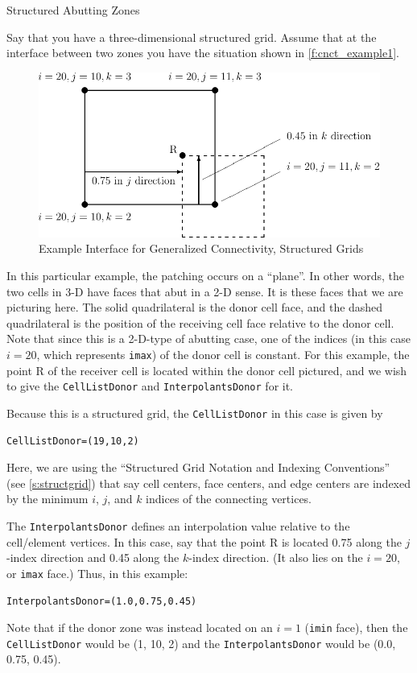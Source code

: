 \begin{example}{Structured Abutting Zones}
\label{ex:struct_abut}

Say that you have a three-dimensional structured grid.
Assume that at the interface between two zones you have the 
situation shown in \autoref{f:cnct_example1}.

\begin{figure}[!htb]
   \centering
   \includegraphics{cnct.figs/cnct_example1}
   \caption{Example Interface for Generalized Connectivity, Structured Grids}
   \label{f:cnct_example1}
\end{figure}

In this particular example, the patching occurs on a ``plane''.
In other words, the two cells in 3-D have faces that abut in a 2-D
sense.
It is these faces that we are picturing here.
The solid quadrilateral is the donor cell face, and the dashed
quadrilateral is the position of the receiving cell face relative to the
donor cell.
Note that since this is a 2-D-type of abutting case, one of the indices
(in this case $i = 20$, which represents \texttt{imax}) of the
donor cell is constant.
For this example, the point R of the receiver cell is located within the
donor cell pictured, and we wish to give the \texttt{CellListDonor} and
\texttt{InterpolantsDonor} for it.

Because this is a structured grid, the \texttt{CellListDonor} in this
case is given by
\begin{alltt}
   CellListDonor = (19, 10, 2)
\end{alltt}

Here, we are using the ``Structured Grid Notation and Indexing
Conventions'' (see \autoref{s:structgrid}) that say cell centers, face
centers, and edge centers are indexed by the minimum $i$, $j$, and $k$
indices of the connecting vertices.

The \texttt{InterpolantsDonor} defines an interpolation value relative
to the cell/element vertices.
In this case, say that the point R is located 0.75 along the
$j$-index direction and 0.45 along the $k$-index direction.
(It also lies on the $i = 20$, or \texttt{imax} face.)
Thus, in this example:
\begin{alltt}
   InterpolantsDonor = (1.0, 0.75, 0.45) 
\end{alltt}
Note that if the donor zone was instead located on an $i = 1$
(\texttt{imin} face), then the \texttt{CellListDonor} would be (1, 10, 2)
and the \texttt{InterpolantsDonor} would be (0.0, 0.75, 0.45).
\end{example}

